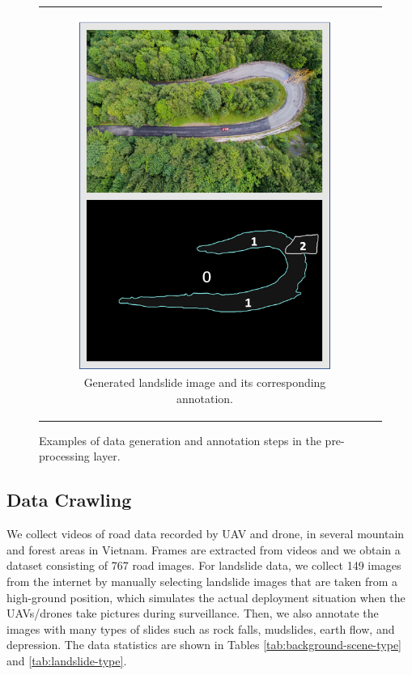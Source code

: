 \documentclass{ieeeaccess}
\begin{document}
\begin{figure}[!t]
\begin{tabular}[b]{cc}
\begin{subfigure}[b]{0.6\columnwidth}
      \includegraphics[width=\textwidth]{Fig/anno.png}
      \caption{Generated landslide image and its corresponding annotation.}
      \label{fig:C}
    \end{subfigure}
  \end{tabular}
  \caption{Examples of data generation and annotation steps in the pre-processing layer.}
  \label{fig:ABC}
\end{figure}

\subsection{Data Crawling} 
We collect videos of road data recorded by UAV and drone, in several mountain and forest areas in Vietnam. Frames are extracted from videos and we obtain a dataset consisting of 767 road images. For landslide data, we collect 149 images from the internet by manually selecting landslide images that are taken from a high-ground position, which simulates the actual deployment situation when the UAVs/drones take pictures during surveillance. Then, we also annotate the images with many types of slides such as rock falls, mudslides, earth flow, and depression. The data statistics are shown in Tables \ref{tab:background-scene-type} and \ref{tab:landslide-type}.
\end{document}
